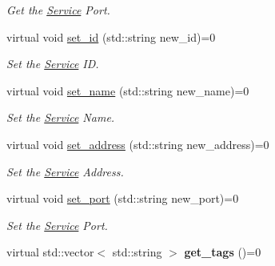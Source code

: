 \begin{DoxyCompactItemize}
\begin{DoxyCompactList}\small\item\em Get the \hyperlink{classService}{Service} Port. \end{DoxyCompactList}\item 
\hypertarget{classServiceInterface_aade793bb679fa00cd34194a3623c554a}{virtual void \hyperlink{classServiceInterface_aade793bb679fa00cd34194a3623c554a}{set\-\_\-id} (std\-::string new\-\_\-id)=0}\label{classServiceInterface_aade793bb679fa00cd34194a3623c554a}

\begin{DoxyCompactList}\small\item\em Set the \hyperlink{classService}{Service} I\-D. \end{DoxyCompactList}\item 
\hypertarget{classServiceInterface_ac9b2d1a785b665ef3c575f5877148511}{virtual void \hyperlink{classServiceInterface_ac9b2d1a785b665ef3c575f5877148511}{set\-\_\-name} (std\-::string new\-\_\-name)=0}\label{classServiceInterface_ac9b2d1a785b665ef3c575f5877148511}

\begin{DoxyCompactList}\small\item\em Set the \hyperlink{classService}{Service} Name. \end{DoxyCompactList}\item 
\hypertarget{classServiceInterface_a619fb75631f816d547d2ad3efeae2bf5}{virtual void \hyperlink{classServiceInterface_a619fb75631f816d547d2ad3efeae2bf5}{set\-\_\-address} (std\-::string new\-\_\-address)=0}\label{classServiceInterface_a619fb75631f816d547d2ad3efeae2bf5}

\begin{DoxyCompactList}\small\item\em Set the \hyperlink{classService}{Service} Address. \end{DoxyCompactList}\item 
\hypertarget{classServiceInterface_a2c9385fbc567949560dc7972e6a7059e}{virtual void \hyperlink{classServiceInterface_a2c9385fbc567949560dc7972e6a7059e}{set\-\_\-port} (std\-::string new\-\_\-port)=0}\label{classServiceInterface_a2c9385fbc567949560dc7972e6a7059e}

\begin{DoxyCompactList}\small\item\em Set the \hyperlink{classService}{Service} Port. \end{DoxyCompactList}\item 
\hypertarget{classServiceInterface_afdc1ce12ef5ff09cf82e3d0f8ea7724a}{virtual std\-::vector$<$ std\-::string $>$ {\bfseries get\-\_\-tags} ()=0}\label{classServiceInterface_afdc1ce12ef5ff09cf82e3d0f8ea7724a}


\end{DoxyCompactItemize}
